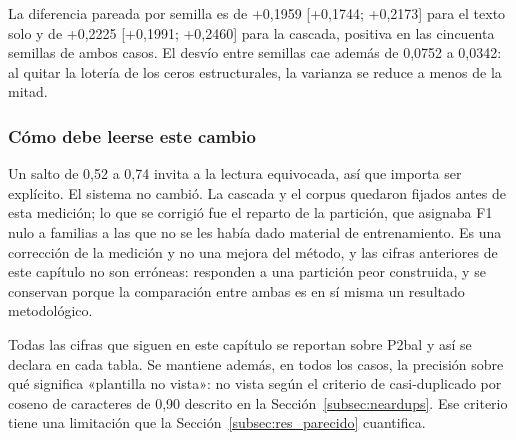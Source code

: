 \begin{table}[ht]
\centering
\caption{El mismo corpus, la misma representación y el mismo clasificador bajo los dos repartos (149 notas, 30 familias, 50 semillas)}
\label{tab:p2bal_resultado}
\end{table}

La diferencia pareada por semilla es de +0,1959 [+0,1744; +0,2173] para el texto solo y de +0,2225 [+0,1991; +0,2460] para la cascada, positiva en las cincuenta semillas de ambos casos. El desvío entre semillas cae además de 0,0752 a 0,0342: al quitar la lotería de los ceros estructurales, la varianza se reduce a menos de la mitad.

\subsubsection*{Cómo debe leerse este cambio}

Un salto de 0,52 a 0,74 invita a la lectura equivocada, así que importa ser explícito. El sistema no cambió. La cascada y el corpus quedaron fijados antes de esta medición; lo que se corrigió fue el reparto de la partición, que asignaba F1 nulo a familias a las que no se les había dado material de entrenamiento. Es una corrección de la medición y no una mejora del método, y las cifras anteriores de este capítulo no son erróneas: responden a una partición peor construida, y se conservan porque la comparación entre ambas es en sí misma un resultado metodológico.

Todas las cifras que siguen en este capítulo se reportan sobre P2bal y así se declara en cada tabla. Se mantiene además, en todos los casos, la precisión sobre qué significa «plantilla no vista»: no vista según el criterio de casi-duplicado por coseno de caracteres de 0,90 descrito en la Sección~\ref{subsec:neardups}. Ese criterio tiene una limitación que la Sección~\ref{subsec:res_parecido} cuantifica.

